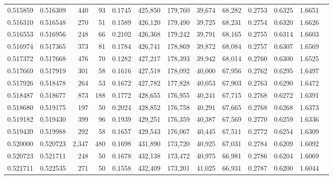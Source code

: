 \begin{tabular}{rrrrrrrrrrrrr}
0.515859 & 0.516309 &   440 &  93 &                                     0.1745 & 425,850 & 179,760 &  39,674 &  68,282 & 0.2753 & 0.6325 & 1.6651 \\
0.516310 & 0.516548 &   270 &  51 &                                     0.1589 & 426,120 & 179,490 &  39,725 &  68,231 & 0.2754 & 0.6320 & 1.6626 \\
0.516553 & 0.516956 &   248 &  66 &                                     0.2102 & 426,368 & 179,242 &  39,791 &  68,165 & 0.2755 & 0.6314 & 1.6603 \\
0.516974 & 0.517365 &   373 &  81 &                                     0.1784 & 426,741 & 178,869 &  39,872 &  68,084 & 0.2757 & 0.6307 & 1.6569 \\
0.517372 & 0.517668 &   476 &  70 &                                     0.1282 & 427,217 & 178,393 &  39,942 &  68,014 & 0.2760 & 0.6300 & 1.6525 \\
0.517669 & 0.517919 &   301 &  58 &                                     0.1616 & 427,518 & 178,092 &  40,000 &  67,956 & 0.2762 & 0.6295 & 1.6497 \\
0.517926 & 0.518478 &   264 &  53 &                                     0.1672 & 427,782 & 177,828 &  40,053 &  67,903 & 0.2763 & 0.6290 & 1.6472 \\
0.518487 & 0.518677 &   873 & 188 &                                     0.1772 & 428,655 & 176,955 &  40,241 &  67,715 & 0.2768 & 0.6272 & 1.6391 \\
0.518680 & 0.519175 &   197 &  50 &                                     0.2024 & 428,852 & 176,758 &  40,291 &  67,665 & 0.2768 & 0.6268 & 1.6373 \\
0.519182 & 0.519430 &   399 &  96 &                                     0.1939 & 429,251 & 176,359 &  40,387 &  67,569 & 0.2770 & 0.6259 & 1.6336 \\
0.519439 & 0.519988 &   292 &  58 &                                     0.1657 & 429,543 & 176,067 &  40,445 &  67,511 & 0.2772 & 0.6254 & 1.6309 \\
0.520000 & 0.520723 & 2,347 & 480 &                                     0.1698 & 431,890 & 173,720 &  40,925 &  67,031 & 0.2784 & 0.6209 & 1.6092 \\
0.520723 & 0.521711 &   248 &  50 &                                     0.1678 & 432,138 & 173,472 &  40,975 &  66,981 & 0.2786 & 0.6204 & 1.6069 \\
0.521711 & 0.522535 &   271 &  50 &                                     0.1558 & 432,409 & 173,201 &  41,025 &  66,931 & 0.2787 & 0.6200 & 1.6044 \\

\end{tabular}

